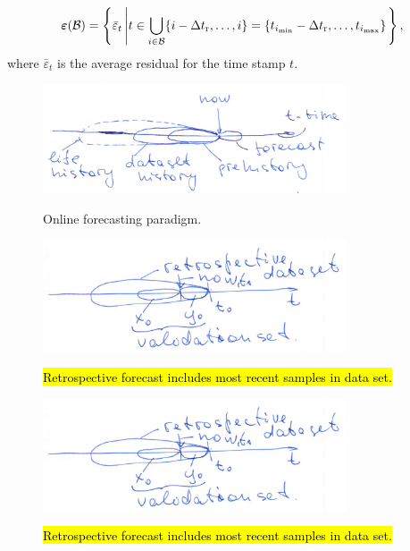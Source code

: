 \documentclass[12pt]{article}
\newcommand{\dtr}{\Delta t_\text{r}}
\begin{document}
\[\veps(\cB) = \left\{\bar{\varepsilon}_t \left| t \in \bigcup_{i \in \cB} \{i-\dtr, \dots, i\} = \{t_{i_{\min}} - \dtr, \dots, t_{i_{\max}}\}\right.\right\}, \]
where $\bar{\varepsilon}_t$ is the average residual for the time stamp $t$.
\begin{figure}[!ht]
\centering\includegraphics[width=0.8\textwidth]{online_forecasting_paradigm.png}
\label{fg:online_frc}
\caption{Online forecasting paradigm.}
\end{figure}


\begin{figure}[!ht]
\centering\includegraphics[width=0.8\textwidth]{retrospective_validation.png}
\label{fg:retrospective}
\caption{\hl{Retrospective forecast includes most recent samples in data set.}}
\end{figure}

\begin{figure}[!ht]
\centering\includegraphics[width=0.8\textwidth]{retrospective_validation.png}
\label{fg:retrospective}
\caption{\hl{Retrospective forecast includes most recent samples in data set.}}
\end{figure}
\end{document}

